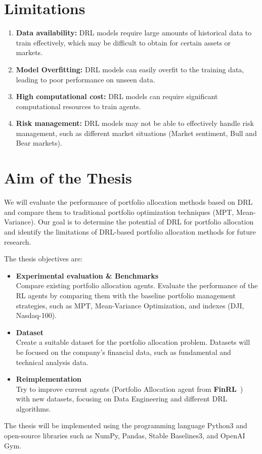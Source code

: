 \documentclass[../xlapes02]{subfiles}
\begin{document}
    \section{Limitations}\label{sec:limitations}

    \begin{enumerate}
        \item \textbf{Data availability:} DRL models require large amounts of historical data to train effectively, which may be difficult to obtain for certain assets or markets.
        \item \textbf{Model Overfitting:} DRL models can easily overfit to the training data, leading to poor performance on unseen data.
        \item \textbf{High computational cost:} DRL models can require significant computational resources to train agents.
        \item \textbf{Risk management:} DRL models may not be able to effectively handle risk management, such as different market situations (Market sentiment, Bull and Bear markets).
    \end{enumerate}


    \section{Aim of the Thesis}\label{sec:aim-of-the-thesis}
    We will evaluate the performance of portfolio allocation methods based on DRL and compare them to traditional portfolio optimization techniques (MPT, Mean-Variance).
    Our goal is to determine the potential of DRL for portfolio allocation and identify the limitations of DRL-based portfolio allocation methods for future research.

    The thesis objectives are:
    \begin{itemize}
        \item \textbf{Experimental evaluation \& Benchmarks}\\
        Compare existing portfolio allocation agents.
        Evaluate the performance of the RL agents by comparing them with the baseline portfolio management strategies, such as MPT, Mean-Variance Optimization, and indexes (DJI, Nasdaq-100).
        \item \textbf{Dataset}\\
        Create a suitable dataset for the portfolio allocation problem.
        Datasets will be focused on the company's financial data, such as fundamental and technical analysis data.
        \item \textbf{Reimplementation}\\
        Try to improve current agents (Portfolio Allocation agent from \textbf{FinRL}~\cite{finrl-portfolio-allocation-2020}) with new datasets, focusing on Data Engineering and different DRL algorithms.
    \end{itemize}

    The thesis will be implemented using the programming language Python3 and open-source libraries such as NumPy, Pandas, Stable Baselines3, and OpenAI Gym.
\end{document}
